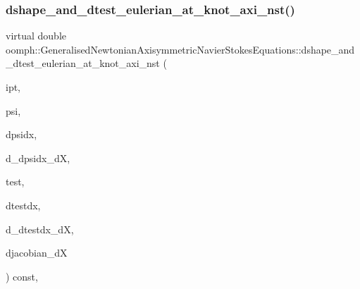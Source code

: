 \mbox{\label{classoomph_1_1GeneralisedNewtonianAxisymmetricNavierStokesEquations_a768856dbac816acd9b207ed6065bcae7}} 
\subsubsection{\texorpdfstring{dshape\+\_\+and\+\_\+dtest\+\_\+eulerian\+\_\+at\+\_\+knot\+\_\+axi\+\_\+nst()}{dshape\_and\_dtest\_eulerian\_at\_knot\_axi\_nst()}\hspace{0.1cm}{\footnotesize\ttfamily [2/2]}}
{\footnotesize\ttfamily virtual double oomph\+::\+Generalised\+Newtonian\+Axisymmetric\+Navier\+Stokes\+Equations\+::dshape\+\_\+and\+\_\+dtest\+\_\+eulerian\+\_\+at\+\_\+knot\+\_\+axi\+\_\+nst (\begin{DoxyParamCaption}\item[{const unsigned \&}]{ipt,  }\item[{\hyperlink{classoomph_1_1Shape}{Shape} \&}]{psi,  }\item[{\hyperlink{classoomph_1_1DShape}{D\+Shape} \&}]{dpsidx,  }\item[{\hyperlink{classoomph_1_1RankFourTensor}{Rank\+Four\+Tensor}$<$ double $>$ \&}]{d\+\_\+dpsidx\+\_\+dX,  }\item[{\hyperlink{classoomph_1_1Shape}{Shape} \&}]{test,  }\item[{\hyperlink{classoomph_1_1DShape}{D\+Shape} \&}]{dtestdx,  }\item[{\hyperlink{classoomph_1_1RankFourTensor}{Rank\+Four\+Tensor}$<$ double $>$ \&}]{d\+\_\+dtestdx\+\_\+dX,  }\item[{\hyperlink{classoomph_1_1DenseMatrix}{Dense\+Matrix}$<$ double $>$ \&}]{djacobian\+\_\+dX }\end{DoxyParamCaption}) const\hspace{0.3cm}{\ttfamily [protected]}, {}}



